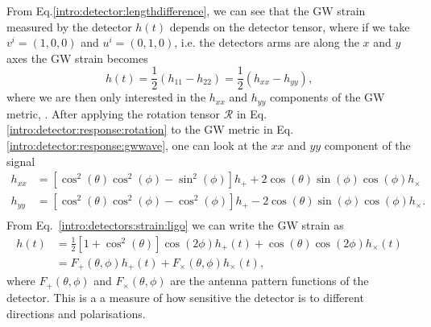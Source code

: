 From Eq.\ref{intro:detector:lengthdifference}, we can see that the \gls{GW} strain measured by the detector $h(t)$ depends on the detector tensor, where if we take $v^i = (1,0,0)$ and $u^i = (0,1,0)$, i.e. the detectors arms are along the $x$ and $y$ axes the \gls{GW} strain becomes 
\begin{equation}
    \label{intro:detectors:strain:ligo}
    h(t) = \frac{1}{2} \left( h_{11} - h_{22} \right) = \frac{1}{2} \left( h_{xx} - h_{yy} \right),
\end{equation}
where we are then only interested in the $h_{xx}$ and $h_{yy}$ components of the \gls{GW} metric, \citep{maggioreGravitationalWaves}.
After applying the rotation tensor $\mathcal{R}$ in Eq.\ref{intro:detector:response:rotation} to the \gls{GW} metric in Eq.\ref{intro:detector:response:gwwave}, one can look at the $xx$ and $yy$ component of the signal
\begin{equation}
    \begin{split}
        h_{xx} &= \left[ \cos^2(\theta) \cos^2 (\phi) - \sin^2 (\phi)\right]h_{+} + 2\cos (\theta) \sin (\phi) \cos (\phi) h_{\times}\\
        h_{yy} &= \left[ \cos^2(\theta) \cos^2 (\phi) - \cos^2 (\phi)\right]h_{+} - 2\cos(\theta) \sin (\phi) \cos(\phi) h_{\times} . \\
    \end{split}
\end{equation}
From Eq.~\ref{intro:detectors:strain:ligo} we can write the \gls{GW} strain as
\begin{equation}
    \label{intro:detector:response:strain:polarisations}
    \begin{split}
        h(t) &= \frac{1}{2} \left[ 1 + \cos^2 \left(\theta\right) \right] \cos\left(2\phi\right) h_{+}(t) + \cos \left(\theta\right) \cos \left(2\phi \right)h_{\times}(t)\\
        &= F_{+}(\theta,\phi)h_{+}(t) + F_{\times}(\theta,\phi)h_{\times}(t),
    \end{split}
\end{equation}
where $F_{+}(\theta,\phi)$ and $F_{\times}(\theta,\phi)$ are the antenna pattern functions of the detector.
This is a a measure of how sensitive the detector is to different directions and polarisations. 

